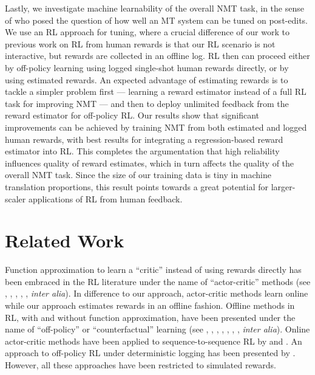 Lastly, we investigate machine learnability of the overall NMT task, in the sense of \citet{GreenETAL:14} who posed the question of how well an MT system can be tuned on post-edits. We use an RL approach for tuning, where a crucial difference of our work to previous work on RL from human rewards \cite{KnoxStone:09,ChristianoETAL:17} is that our RL scenario is not interactive, but rewards are collected in an offline log. RL then can proceed either by off-policy learning using logged single-shot human rewards directly, or by using estimated rewards. An expected advantage of estimating rewards is to tackle a simpler problem first --- learning a reward estimator instead of a full RL task for improving NMT --- and then to deploy unlimited feedback from the reward estimator for off-policy RL. Our results show that significant improvements can be achieved by training NMT from both estimated and logged human rewards, with best results for integrating a regression-based reward estimator into RL. This completes the argumentation that high reliability influences quality of reward estimates, which in turn affects the quality of the overall NMT task. Since the size of our training data is tiny in machine translation proportions, this result points towards a great potential for larger-scaler applications of RL from human feedback.

\section{Related Work}
\label{sec:related}

Function approximation to learn a ``critic'' instead of using rewards directly has been embraced in the RL literature under the name of ``actor-critic'' methods (see \citet{KondaTsitsiklis:00}, \citet{SuttonETAL:00}, \citet{Kakade:02}, \citet{SchulmanETAL:15}, \citet{MnihETAL:16}, \emph{inter alia}). In difference to our approach, actor-critic methods learn online while our approach estimates rewards in an offline fashion. Offline methods in RL, with and without function approximation, have been presented under the name of ``off-policy'' or ``counterfactual'' learning (see \citet{PrecupETAL:00}, \citet{PrecupETAL:01}, \citet{BottouETAL:13}, \citet{SwaminathanJoachims:15}, \citet{SwaminathanJoachimsNIPS:15}, \citet{JiangLi:16}, \citet{ThomasBrunskill:16}, \emph{inter alia}). Online actor-critic methods have been applied to sequence-to-sequence RL by \citet{BahdanauETAL:17} and \citet{NguyenETAL:17}. An approach to off-policy RL under deterministic logging has been presented by \citet{LawrenceETAL:17}. However, all these approaches have been restricted to simulated rewards.

